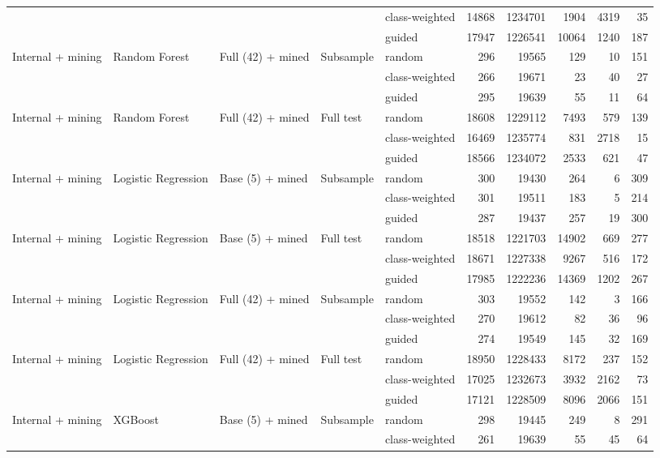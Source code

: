 \begin{longtable}{lllllrrrrr}
 &  &  &  & class-weighted & 14868 & 1234701 & 1904 & 4319 & 35 \\
 &  &  &  & guided & 17947 & 1226541 & 10064 & 1240 & 187 \\
\addlinespace
Internal + mining & Random Forest & Full (42) + mined & Subsample & random & 296 & 19565 & 129 & 10 & 151 \\
 &  &  &  & class-weighted & 266 & 19671 & 23 & 40 & 27 \\
 &  &  &  & guided & 295 & 19639 & 55 & 11 & 64 \\
\addlinespace
Internal + mining & Random Forest & Full (42) + mined & Full test & random & 18608 & 1229112 & 7493 & 579 & 139 \\
 &  &  &  & class-weighted & 16469 & 1235774 & 831 & 2718 & 15 \\
 &  &  &  & guided & 18566 & 1234072 & 2533 & 621 & 47 \\
\addlinespace
Internal + mining & Logistic Regression & Base (5) + mined & Subsample & random & 300 & 19430 & 264 & 6 & 309 \\
 &  &  &  & class-weighted & 301 & 19511 & 183 & 5 & 214 \\
 &  &  &  & guided & 287 & 19437 & 257 & 19 & 300 \\
\addlinespace
Internal + mining & Logistic Regression & Base (5) + mined & Full test & random & 18518 & 1221703 & 14902 & 669 & 277 \\
 &  &  &  & class-weighted & 18671 & 1227338 & 9267 & 516 & 172 \\
 &  &  &  & guided & 17985 & 1222236 & 14369 & 1202 & 267 \\
\addlinespace
Internal + mining & Logistic Regression & Full (42) + mined & Subsample & random & 303 & 19552 & 142 & 3 & 166 \\
 &  &  &  & class-weighted & 270 & 19612 & 82 & 36 & 96 \\
 &  &  &  & guided & 274 & 19549 & 145 & 32 & 169 \\
\addlinespace
Internal + mining & Logistic Regression & Full (42) + mined & Full test & random & 18950 & 1228433 & 8172 & 237 & 152 \\
 &  &  &  & class-weighted & 17025 & 1232673 & 3932 & 2162 & 73 \\
 &  &  &  & guided & 17121 & 1228509 & 8096 & 2066 & 151 \\
\addlinespace
Internal + mining & XGBoost & Base (5) + mined & Subsample & random & 298 & 19445 & 249 & 8 & 291 \\
 &  &  &  & class-weighted & 261 & 19639 & 55 & 45 & 64 \\

\end{longtable}
